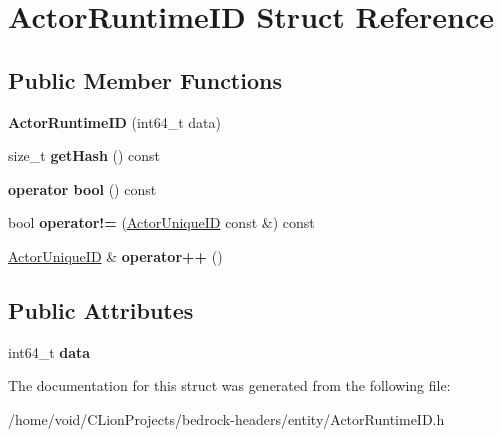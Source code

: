 \hypertarget{struct_actor_runtime_i_d}{}\section{Actor\+Runtime\+ID Struct Reference}
\label{struct_actor_runtime_i_d}
\subsection*{Public Member Functions}
\begin{DoxyCompactItemize}
\item 
\mbox{\label{struct_actor_runtime_i_d_a29e66eb50fe6bc4976a429e3f7956b5a}} 
{\bfseries Actor\+Runtime\+ID} (int64\+\_\+t data)
\item 
\mbox{\label{struct_actor_runtime_i_d_aee1f762075ede5af8514b251cde10f6a}} 
size\+\_\+t {\bfseries get\+Hash} () const
\item 
\mbox{\label{struct_actor_runtime_i_d_a06815e9868dd43a261bc87875f5fe6b1}} 
{\bfseries operator bool} () const
\item 
\mbox{\label{struct_actor_runtime_i_d_a6d37314696d1e2239140b0317ee18fde}} 
bool {\bfseries operator!=} (\mbox{\hyperlink{struct_actor_unique_i_d}{Actor\+Unique\+ID}} const \&) const
\item 
\mbox{\label{struct_actor_runtime_i_d_af7782a14b7dfa5dad9205ee6d9cd9381}} 
\mbox{\hyperlink{struct_actor_unique_i_d}{Actor\+Unique\+ID}} \& {\bfseries operator++} ()
\end{DoxyCompactItemize}
\subsection*{Public Attributes}
\begin{DoxyCompactItemize}
\item 
\mbox{\label{struct_actor_runtime_i_d_a09a186da540ebb1f82783fdc5a3447d9}} 
int64\+\_\+t {\bfseries data}
\end{DoxyCompactItemize}


The documentation for this struct was generated from the following file\+:\begin{DoxyCompactItemize}
\item 
/home/void/\+C\+Lion\+Projects/bedrock-\/headers/entity/Actor\+Runtime\+I\+D.\+h\end{DoxyCompactItemize}
